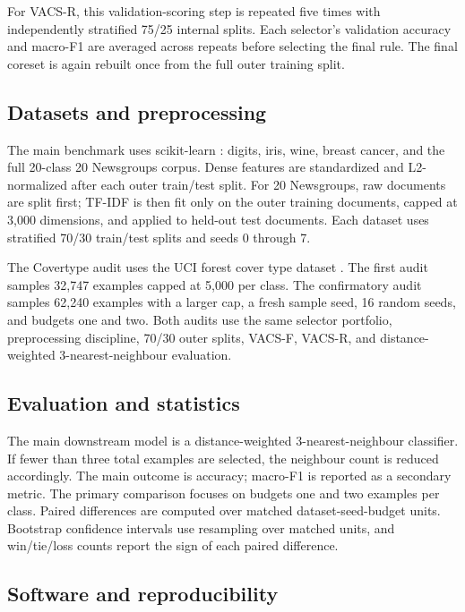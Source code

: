 \documentclass[12pt]{article}
\begin{document}
For VACS-R, this validation-scoring step is repeated five times with independently stratified 75/25 internal splits. Each selector's validation accuracy and macro-F1 are averaged across repeats before selecting the final rule. The final coreset is again rebuilt once from the full outer training split.

\subsection*{Datasets and preprocessing}

The main benchmark uses scikit-learn \citep{pedregosa2011scikit}: digits, iris, wine, breast cancer, and the full 20-class 20 Newsgroups corpus. Dense features are standardized and L2-normalized after each outer train/test split. For 20 Newsgroups, raw documents are split first; TF-IDF is then fit only on the outer training documents, capped at 3,000 dimensions, and applied to held-out test documents. Each dataset uses stratified 70/30 train/test splits and seeds 0 through 7.

The Covertype audit uses the UCI forest cover type dataset \citep{blackard1998covertype}. The first audit samples 32,747 examples capped at 5,000 per class. The confirmatory audit samples 62,240 examples with a larger cap, a fresh sample seed, 16 random seeds, and budgets one and two. Both audits use the same selector portfolio, preprocessing discipline, 70/30 outer splits, VACS-F, VACS-R, and distance-weighted 3-nearest-neighbour evaluation.

\subsection*{Evaluation and statistics}

The main downstream model is a distance-weighted 3-nearest-neighbour classifier. If fewer than three total examples are selected, the neighbour count is reduced accordingly. The main outcome is accuracy; macro-F1 is reported as a secondary metric. The primary comparison focuses on budgets one and two examples per class. Paired differences are computed over matched dataset-seed-budget units. Bootstrap confidence intervals use resampling over matched units, and win/tie/loss counts report the sign of each paired difference.

\subsection*{Software and reproducibility}
\end{document}
